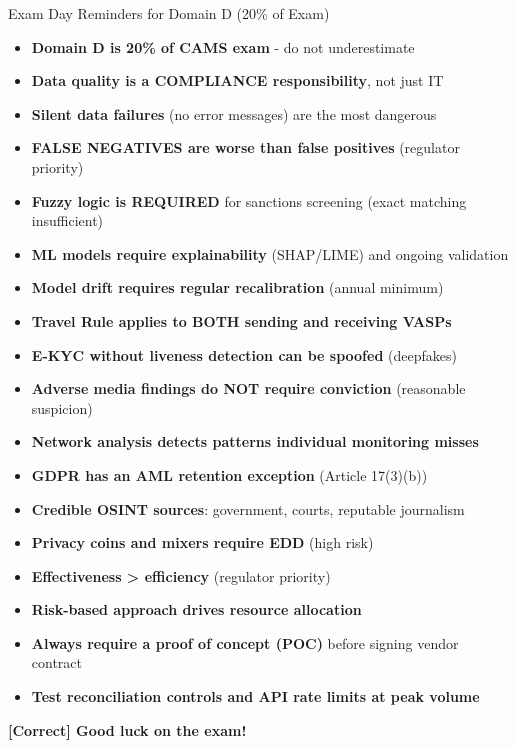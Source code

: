 \documentclass[11pt,a4paper]{beamer}
\newcommand{\greennote}[1]{\textcolor{green!50!black}{\textbf{[Correct] #1}}}
\begin{document}
\begin{frame}{Exam Day Reminders for Domain D (20\% of Exam)}
	\begin{itemize}
		\item \textbf{Domain D is 20\% of CAMS exam} - do not underestimate
		\item \textbf{Data quality is a COMPLIANCE responsibility}, not just IT
		\item \textbf{Silent data failures} (no error messages) are the most dangerous
		\item \textbf{FALSE NEGATIVES are worse than false positives} (regulator priority)
		\item \textbf{Fuzzy logic is REQUIRED} for sanctions screening (exact matching insufficient)
		\item \textbf{ML models require explainability} (SHAP/LIME) and ongoing validation
		\item \textbf{Model drift requires regular recalibration} (annual minimum)
		\item \textbf{Travel Rule applies to BOTH sending and receiving VASPs}
		\item \textbf{E-KYC without liveness detection can be spoofed} (deepfakes)
		\item \textbf{Adverse media findings do NOT require conviction} (reasonable suspicion)
		\item \textbf{Network analysis detects patterns individual monitoring misses}
		\item \textbf{GDPR has an AML retention exception} (Article 17(3)(b))
		\item \textbf{Credible OSINT sources}: government, courts, reputable journalism
		\item \textbf{Privacy coins and mixers require EDD} (high risk)
		\item \textbf{Effectiveness > efficiency} (regulator priority)
		\item \textbf{Risk-based approach drives resource allocation}
		\item \textbf{Always require a proof of concept (POC)} before signing vendor contract
		\item \textbf{Test reconciliation controls and API rate limits at peak volume}
	\end{itemize}
	\vspace{0.3cm}
	\centering
	\greennote{Good luck on the exam!}
\end{frame}
\end{document}
